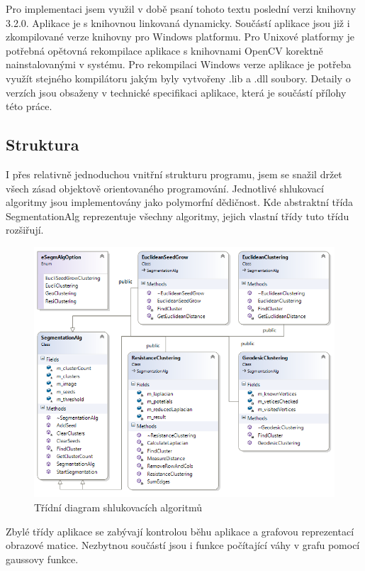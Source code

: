 \documentclass[czech, master, public, dept460, male, cpdeclaration, oneside]{diploma}
\begin{document}
\noindent
Pro implementaci jsem využil v době psaní tohoto textu poslední verzi knihovny 3.2.0. Aplikace je s knihovnou linkovaná dynamicky. Součástí aplikace jsou již i zkompilované verze knihovny pro Windows platformu. Pro Unixové platformy je potřebná  opětovná rekompilace aplikace s knihovnami OpenCV korektně nainstalovanými v systému. Pro rekompilaci Windows verze aplikace je potřeba využít stejného kompilátoru jakým byly vytvořeny .lib a .dll soubory. Detaily o verzích jsou obsaženy v technické specifikaci aplikace, která je součástí přílohy této práce.

\subsection{Struktura}
I přes relativně jednoduchou vnitřní strukturu programu, jsem se snažil držet všech zásad objektově orientovaného programování. Jednotlivé shlukovací algoritmy jsou implementovány jako polymorfní dědičnost. Kde abstraktní třída SegmentationAlg reprezentuje všechny algoritmy, jejich vlastní třídy tuto třídu rozšiřují.
\begin{figure}[H]
	\vspace*{+3.0mm}
	\centering
	\includegraphics[width=14cm]{Figures/explanatory/classDiagramPoly.png}
	\caption{Třídní diagram shlukovacích algoritmů}
\end{figure}

\noindent
Zbylé třídy aplikace se zabývají kontrolou běhu aplikace a grafovou reprezentací obrazové matice. Nezbytnou součástí jsou i funkce počítající váhy v grafu pomocí gaussovy funkce. 
\end{document}
